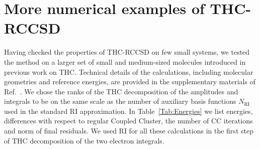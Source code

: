 \section{{More numerical examples of THC-RCCSD}
\label{sec:more_examples_thc}}
Having checked the properties of THC-RCCSD on few small systems, we 
tested the method on a larger set of small and medium-sized molecules introduced 
in previous work on THC.\cite{hohenstein_thc3} Technical details of the 
calculations, including molecular geometries and reference energies, are 
provided in the supplementary materials of Ref.~\cite{schutski2017tensor}. We 
chose the ranks of the THC decomposition of the amplitudes and integrals to be 
on the same scale as the number of auxiliary basis functions $N_\mathrm{RI}$ 
used in the standard RI approximation. In Table~\ref{Tab:Energies} we list 
energies, differences with respect to regular Coupled Cluster, the number of CC 
iterations and norm of final residuals. We used RI for all these calculations 
in the first step of THC decomposition of the two electron integrals. 
%
